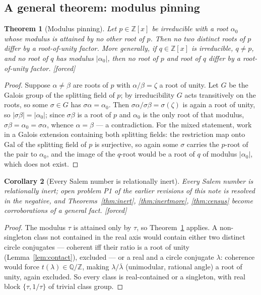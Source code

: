 \documentclass[11pt]{article}
\theoremstyle{plain}
\newtheorem{theorem}{Theorem}[section]
\newtheorem{corollary}[theorem]{Corollary}
\theoremstyle{definition}
\theoremstyle{remark}
\newcommand{\Q}{\mathbb{Q}}
\newcommand{\Z}{\mathbb{Z}}
\newcommand{\F}{\textnormal{[forced]}}
\begin{document}
\subsection{A general theorem: modulus pinning}

\begin{theorem}[Modulus pinning]\label{thm:pinning}
Let $p\in\Z[x]$ be irreducible with a root $\alpha_0$ whose modulus is
attained by no other root of $p$. Then no two distinct roots of $p$ differ
by a root-of-unity factor. More generally, if $q\in\Z[x]$ is irreducible,
$q\neq p$, and no root of $q$ has modulus $|\alpha_0|$, then no root of $p$
and root of $q$ differ by a root-of-unity factor. \F
\end{theorem}

\begin{proof}
Suppose $\alpha\neq\beta$ are roots of $p$ with $\alpha/\beta=\zeta$ a root
of unity. Let $G$ be the Galois group of the splitting field of $p$; by
irreducibility $G$ acts transitively on the roots, so some $\sigma\in G$
has $\sigma\alpha=\alpha_0$. Then
$\sigma\alpha/\sigma\beta=\sigma(\zeta)$ is again a root of unity, so
$|\sigma\beta|=|\alpha_0|$; since $\sigma\beta$ is a root of $p$ and
$\alpha_0$ is the only root of that modulus, $\sigma\beta=\alpha_0
=\sigma\alpha$, whence $\alpha=\beta$ --- a contradiction. For the mixed
statement, work in a Galois extension containing both splitting fields: the
restriction map onto $\mathrm{Gal}$ of the splitting field of $p$ is
surjective, so again some $\sigma$ carries the $p$-root of the pair to
$\alpha_0$, and the image of the $q$-root would be a root of $q$ of modulus
$|\alpha_0|$, which does not exist.
\end{proof}

\begin{corollary}[Every Salem number is relationally inert]
\label{cor:allinert}
Every Salem number is relationally inert; open problem P1 of the earlier
revisions of this note is resolved in the negative, and
Theorems~\ref{thm:inert}, \ref{thm:inertmore}, \ref{thm:census} become
corroborations of a general fact. \F
\end{corollary}

\begin{proof}
The modulus $\tau$ is attained only by $\tau$, so
Theorem~\ref{thm:pinning} applies. A non-singleton class not contained in
the real axis would contain either two distinct circle conjugates ---
coherent iff their ratio is a root of unity (Lemma~\ref{lem:contact}),
excluded --- or a real and a circle conjugate $\lambda$: coherence would
force $t(\lambda)\in\Q/\Z$, making $\lambda/\overline{\lambda}$
(unimodular, rational angle) a root of unity, again excluded. So every
class is real-contained or a singleton, with real block $\{\tau,1/\tau\}$
of trivial class group.
\end{proof}
\end{document}
